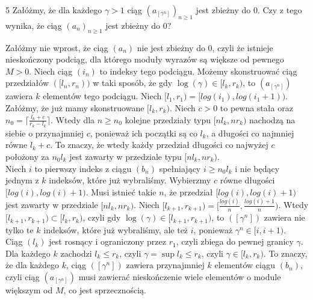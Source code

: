 \documentclass{../note}
\begin{document}
\begin{zadanie}{5}
Załóżmy, że dla każdego \( \gamma>1 \) ciąg \( (a_{[\gamma^{n}]})_{n\ge1} \) jest zbieżny do 0. Czy z tego wynika, że ciąg \( (a_{n})_{n\geq1} \) jest zbieżny do 0?
\end{zadanie}
\begin{rozwiazanie}
Załóżmy nie wprost, że ciąg $(a_n)$ nie jest zbieżny do 0, czyli że istnieje nieskończony podciąg, dla którego moduły wyrazów są większe od pewnego $M > 0$. Niech ciąg $(i_n)$ to indeksy tego podciągu. Możemy skonstruować ciąg przedziałów $([l_n, r_n))$ w taki sposób, że gdy $\log(\gamma) \in [l_k, r_k)$, to $(a_{[\gamma^n]})$ zawiera $k$ elementów tego podciągu. Niech $[l_1, r_1) = [log(i_1), log(i_1 + 1))$.\\ Załóżmy, że już mamy skonstruowane $[l_k, r_k)$. Niech $c > 0$ to pewna stała oraz $n_0 = \lceil\frac{l_k + c}{r_k - l_k}\rceil$. Wtedy dla $n \geq n_0$ kolejne przedziały typu $[nl_k, nr_k)$ nachodzą na siebie o przynajmniej $c$, ponieważ ich początki są co $l_k$, a długości co najmniej równe $l_k + c$. To znaczy, że wtedy każdy przedział długości co najwyżej $c$ położony za $n_0l_k$ jest zawarty w przedziale typu $[nl_k, nr_k)$.\\
Niech $i$ to pierwszy indeks z ciągu $(b_n)$ spełniający $i \geq n_0l_k$ i nie będący jednym z $k$ indeksów, które już wybraliśmy. Wybierzmy $c$ równe długości $[log(i), log(i) + 1)$. Musi istnieć takie $n$, że przedział $[log(i), log(i) + 1)$ jest zawarty w przedziale $[nl_k, nr_k)$. Niech $[l_{k+1}, r_{k+1}) = [\frac{log(i)}{n}, \frac{log(i) + 1}{n})$. Wtedy $[l_{k+1}, r_{k+1}) \subset [l_k, r_k)$, czyli gdy $\log(\gamma) \in [l_{k+1}, r_{k+1})$, to $([\gamma^n])$ zawiera nie tylko te $k$ indeksów, które już wybraliśmy, ale też $i$, ponieważ $\gamma^n \in [i, i + 1)$.\\
Ciąg $(l_k)$ jest rosnący i ograniczony przez $r_1$, czyli zbiega do pewnej granicy $\gamma$. Dla każdego $k$ zachodzi $l_k \leq r_k$, czyli $\gamma = \sup l_k \leq r_k$, czyli $\gamma \in [l_k, r_k)$. To znaczy, że dla każdego $k$, ciąg $([\gamma^n])$ zawiera przynajmniej $k$ elementów ciągu $(b_n)$, czyli ciąg $(a_{[\gamma^n]})$ musi zawierać nieskończenie wiele elementów o module większym od $M$, co jest sprzecznością.
\end{rozwiazanie}
\end{document}

